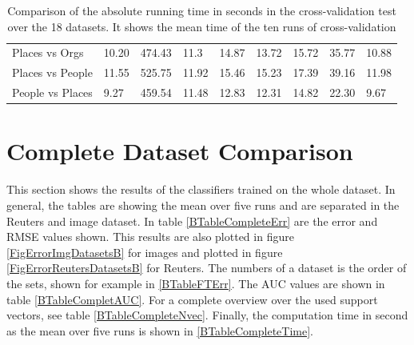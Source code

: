 \begin{table}[]
{\begin{tabular}{@{}lllllllll@{}}
			Places vs Orgs        & 10.20 & 474.43 & 11.3 & 14.87         & 13.72 & 15.72 & 35.77 & 10.88 \\
			Places vs People      & 11.55 & 525.75 & 11.92 & 15.46         & 15.23 & 17.39 & 39.16 & 11.98 \\
			People vs Places      & 9.27  & 459.54 & 11.48 & 12.83         & 12.31 & 14.82 & 22.30 & 9.67  \\ \bottomrule
	\end{tabular}}
	\caption[Time comparison from cross-validation]{Comparison of the absolute running time in seconds in the cross-validation test over the 18 datasets. It shows the mean time of the ten runs of cross-validation\label{BTableFTTime}}
\end{table}
\section{Complete Dataset Comparison}\label{BSecCom}
This section shows the results of the classifiers trained on the whole dataset. 
In general, the tables are showing the mean over five runs and are separated in the Reuters and image dataset.
In table \ref{BTableCompleteErr} are the error and \acs{RMSE} values shown.
This results are also plotted in figure \ref{FigErrorImgDatasetsB} for images and plotted in figure \ref{FigErrorReutersDatasetsB} for Reuters.
The numbers of a dataset is the order of the sets, shown for example in \ref{BTableFTErr}.
The \acs{AUC} values are shown in table \ref{BTableCompletAUC}.
For a complete overview over the used support vectors, see table \ref{BTableCompleteNvec}.
Finally, the computation time in second as the mean over five runs is shown in \ref{BTableCompleteTime}. 
